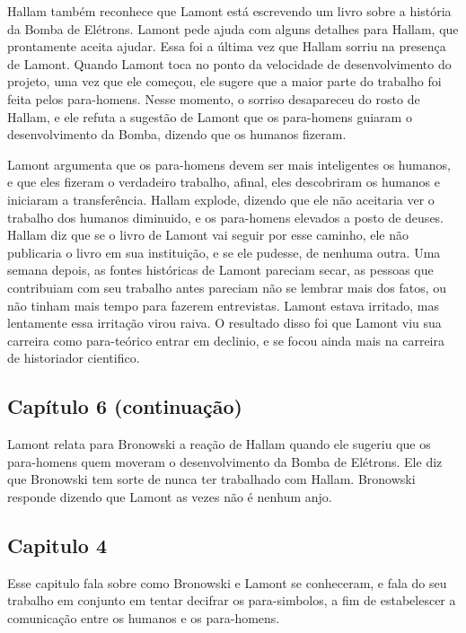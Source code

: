 \documentclass[14pt,portuguese]{extreport}
\begin{document}
        Hallam também reconhece que Lamont está escrevendo um livro sobre a história da Bomba de Elétrons. Lamont pede ajuda com alguns detalhes para Hallam, que prontamente aceita ajudar. Essa foi a última vez que Hallam sorriu na presença de Lamont. Quando Lamont toca no ponto da velocidade de desenvolvimento do projeto, uma vez que ele começou, ele sugere que a maior parte do trabalho foi feita pelos para-homens. Nesse momento, o sorriso desapareceu do rosto de Hallam, e ele refuta a sugestão de Lamont que os para-homens 
    	  guiaram o desenvolvimento da Bomba, dizendo que os humanos fizeram. 

        Lamont argumenta que os para-homens devem ser mais inteligentes os humanos, e que eles fizeram o verdadeiro trabalho, afinal, eles descobriram os humanos e iniciaram a transferência. Hallam explode, dizendo que ele não aceitaria ver o trabalho dos humanos diminuido, e os para-homens elevados a posto de deuses. Hallam diz que se o livro de Lamont vai seguir por esse caminho, ele não publicaria o livro em sua instituição, e se ele pudesse, de nenhuma outra. Uma semana depois, as fontes históricas de Lamont pareciam secar, as pessoas que contribuiam com seu trabalho antes pareciam não se lembrar mais dos fatos, ou não tinham mais tempo para fazerem entrevistas. Lamont estava irritado, mas lentamente essa irritação virou raiva. O resultado disso foi que Lamont viu sua carreira como para-teórico entrar em declinio, e se focou ainda mais na carreira de historiador cientifico.

      \subsection{Capítulo 6 (continuação)}

    	  Lamont relata para Bronowski a reação de Hallam quando ele sugeriu que os para-homens quem 
    	  moveram o desenvolvimento da Bomba de Elétrons. Ele diz que Bronowski tem sorte de nunca ter 
    	  trabalhado com Hallam. Bronowski responde dizendo que Lamont as vezes não é nenhum anjo.

      \subsection{Capitulo 4}

    	  Esse capitulo fala sobre como Bronowski e Lamont se conheceram, e fala do seu trabalho em 
    	  conjunto em tentar decifrar os para-simbolos, a fim de estabelescer a comunicação entre os 
    	  humanos e os para-homens.
	
\end{document}
